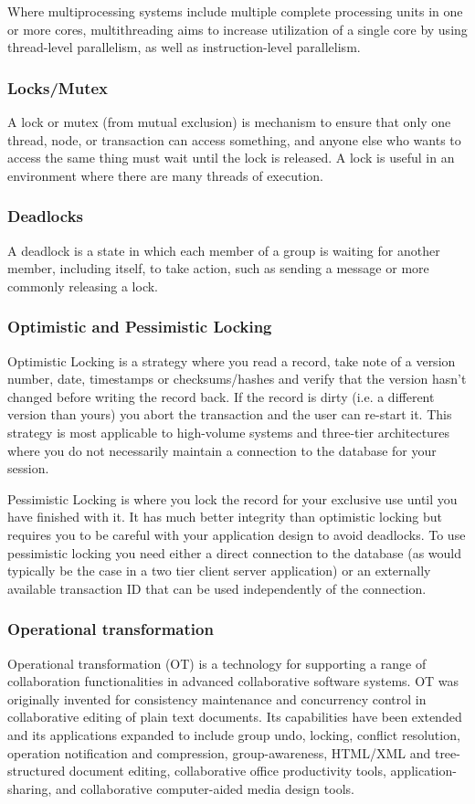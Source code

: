 \documentclass{article}
\begin{document}
    Where multiprocessing systems include multiple complete processing units in one or more cores, multithreading aims to increase utilization of a single core by using thread-level parallelism, as well as instruction-level parallelism.
    
    \subsubsection{Locks/Mutex}
    A lock  or mutex (from mutual exclusion) is mechanism to ensure that only one thread, node, or transaction can access something, and anyone else who wants to access the same thing must wait until the lock is released. A lock is useful in an environment where there are many threads of execution.
    
    \subsubsection{Deadlocks}
    A deadlock is a state in which each member of a group is waiting for another member, including itself, to take action, such as sending a message or more commonly releasing a lock.

    \subsubsection{Optimistic and Pessimistic Locking}
    Optimistic Locking is a strategy where you read a record, take note of a version number, date, timestamps or checksums/hashes and verify that the version hasn't changed before writing the record back. If the record is dirty (i.e. a different version than yours) you abort the transaction and the user can re-start it. This strategy is most applicable to high-volume systems and three-tier architectures where you do not necessarily maintain a connection to the database for your session.
    
    Pessimistic Locking is where you lock the record for your exclusive use until you have finished with it. It has much better integrity than optimistic locking but requires you to be careful with your application design to avoid deadlocks. To use pessimistic locking you need either a direct connection to the database (as would typically be the case in a two tier client server application) or an externally available transaction ID that can be used independently of the connection.

    \subsubsection{Operational transformation}
    Operational transformation (OT) is a technology for supporting a range of collaboration functionalities in advanced collaborative software systems. OT was originally invented for consistency maintenance and concurrency control in collaborative editing of plain text documents. Its capabilities have been extended and its applications expanded to include group undo, locking, conflict resolution, operation notification and compression, group-awareness, HTML/XML and tree-structured document editing, collaborative office productivity tools, application-sharing, and collaborative computer-aided media design tools.
    
\end{document}
